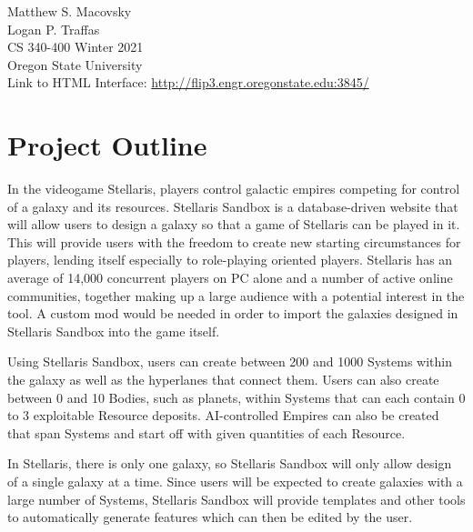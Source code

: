 \documentclass[12pt]{article}
\begin{document}
\begin{titlepage}
    \vspace*{15em}{\centering\Huge Stellaris Sandbox: \\ DML and DDL Queries\par}
    \vspace{1em}
    \centering \Large Matthew S. Macovsky \\
    \vspace{0.5em}
    \centering \Large Logan P. Traffas \\
    \vspace{1em}
    \centering \Large CS 340-400 Winter 2021 \\
    \vspace{1em}
    \centering \Large Oregon State University \\
    \vspace*{\fill}
    \large Link to HTML Interface: \url{http://flip3.engr.oregonstate.edu:3845/}
\end{titlepage}

\tableofcontents

\newpage
\section{Project Outline}

In the videogame Stellaris, players control galactic empires competing for control of a galaxy and its resources. Stellaris Sandbox is a database-driven website that will allow users to design a galaxy so that a game of Stellaris can be played in it. This will provide users with the freedom to create new starting circumstances for players, lending itself especially to role-playing oriented players. Stellaris has an average of 14,000 concurrent players on PC alone and a number of active online communities, together making up a large audience with a potential interest in the tool. A custom mod would be needed in order to import the galaxies designed in Stellaris Sandbox into the game itself. 

Using Stellaris Sandbox, users can create between 200 and 1000 Systems within the galaxy as well as the hyperlanes that connect them. Users can also create between 0 and 10 Bodies, such as planets, within Systems that can each contain 0 to 3 exploitable Resource deposits. AI-controlled Empires can also be created that span Systems and start off with given quantities of each Resource.

In Stellaris, there is only one galaxy, so Stellaris Sandbox will only allow design of a single galaxy at a time. Since users will be expected to create galaxies with a large number of Systems, Stellaris Sandbox will provide templates and other tools to automatically generate features which can then be edited by the user.
\end{document}
